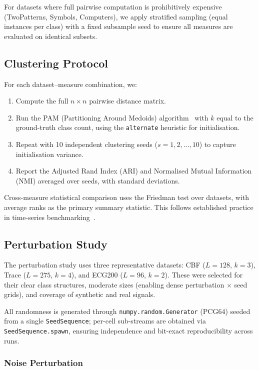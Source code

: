 For datasets where full pairwise computation is prohibitively expensive (TwoPatterns, Symbols, Computers), we apply stratified sampling (equal instances per class) with a fixed subsample seed to ensure all measures are evaluated on identical subsets.

\subsection{Clustering Protocol}\label{sec:method-clustering}

For each dataset--measure combination, we:
\begin{enumerate}
    \item Compute the full $n \times n$ pairwise distance matrix.
    \item Run the PAM (Partitioning Around Medoids) algorithm~\cite{kaufman1990pam} with $k$ equal to the ground-truth class count, using the \texttt{alternate} heuristic for initialisation.
    \item Repeat with 10 independent clustering seeds ($s = 1, 2, \ldots, 10$) to capture initialisation variance.
    \item Report the Adjusted Rand Index (ARI) and Normalised Mutual Information (NMI) averaged over seeds, with standard deviations.
\end{enumerate}

Cross-measure statistical comparison uses the Friedman test over datasets, with average ranks as the primary summary statistic.
This follows established practice in time-series benchmarking~\cite{bagnall2017bakeoff,paparrizos2025tscbenchmark}.

\subsection{Perturbation Study}\label{sec:method-perturbation}

The perturbation study uses three representative datasets: CBF ($L=128$, $k=3$), Trace ($L=275$, $k=4$), and ECG200 ($L=96$, $k=2$).
These were selected for their clear class structures, moderate sizes (enabling dense perturbation $\times$ seed grids), and coverage of synthetic and real signals.

All randomness is generated through \texttt{numpy.random.Generator} (PCG64) seeded from a single \texttt{SeedSequence}; per-cell sub-streams are obtained via \texttt{SeedSequence.spawn}, ensuring independence and bit-exact reproducibility across runs.

\subsubsection{Noise Perturbation}\label{sec:method-noise}

